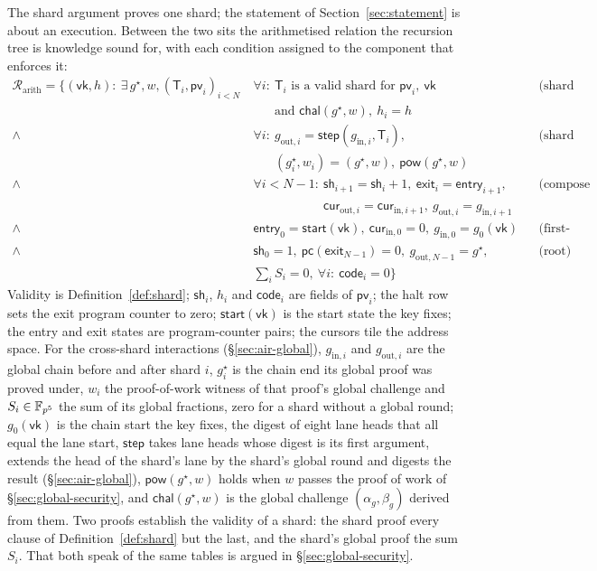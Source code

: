The shard argument proves one shard; the statement of Section~\ref{sec:statement} is about an execution. Between the two sits the arithmetised relation the recursion tree is knowledge sound for, with each condition assigned to the component that enforces it:
\begin{align*}
  \mathcal R_{\mathrm{arith}} = \Big\{ (\mathsf{vk}, h) :\ \exists\, g^\star, w, (\mathsf{T}_i, \mathsf{pv}_i)_{i<N}\
  & \forall i:\ \mathsf{T}_i \text{ is a valid shard for } \mathsf{pv}_i,\ \mathsf{vk}
    && \text{(shard and global proofs)} \\
  & \phantom{\forall i:\ }\text{and } \mathsf{chal}(g^\star, w),\ h_i = h \\
  \wedge\ & \forall i:\ g_{\mathrm{out},i} = \mathsf{step}(g_{\mathrm{in},i}, \mathsf{T}_i),
    && \text{(shard and global leaves)} \\
  & \phantom{\forall i:\ }(g^\star_i, w_i) = (g^\star, w),\ \mathsf{pow}(g^\star, w) \\
  \wedge\ & \forall i<N-1:\ \mathsf{sh}_{i+1} = \mathsf{sh}_i + 1,\ \mathsf{exit}_i = \mathsf{entry}_{i+1},
    && \text{(compose nodes)} \\
  & \phantom{\forall i<N-1:\ }\mathsf{cur}_{\mathrm{out},i} = \mathsf{cur}_{\mathrm{in},i+1},\ g_{\mathrm{out},i} = g_{\mathrm{in},i+1} \\
  \wedge\ & \mathsf{entry}_0 = \mathsf{start}(\mathsf{vk}),\ \mathsf{cur}_{\mathrm{in},0} = 0,\ g_{\mathrm{in},0} = g_0(\mathsf{vk})
    && \text{(first-shard leaf)} \\
  \wedge\ & \mathsf{sh}_0 = 1,\ \mathsf{pc}(\mathsf{exit}_{N-1}) = 0,\ g_{\mathrm{out},N-1} = g^\star,
    && \text{(root)} \\
  & \textstyle\sum_i S_i = 0,\ \forall i:\ \mathsf{code}_i = 0 \Big\}
\end{align*}
Validity is Definition~\ref{def:shard}; $\mathsf{sh}_i$, $h_i$ and $\mathsf{code}_i$ are fields of $\mathsf{pv}_i$; the halt row sets the exit program counter to zero; $\mathsf{start}(\mathsf{vk})$ is the start state the key fixes; the entry and exit states are program-counter pairs; the cursors tile the address space. For the cross-shard interactions (\S\ref{sec:air-global}), $g_{\mathrm{in},i}$ and $g_{\mathrm{out},i}$ are the global chain before and after shard $i$, $g^\star_i$ is the chain end its global proof was proved under, $w_i$ the proof-of-work witness of that proof's global challenge and $S_i \in \mathbb{F}_{p^5}$ the sum of its global fractions, zero for a shard without a global round; $g_0(\mathsf{vk})$ is the chain start the key fixes, the digest of eight lane heads that all equal the lane start, $\mathsf{step}$ takes lane heads whose digest is its first argument, extends the head of the shard's lane by the shard's global round and digests the result (\S\ref{sec:air-global}), $\mathsf{pow}(g^\star, w)$ holds when $w$ passes the proof of work of \S\ref{sec:global-security}, and $\mathsf{chal}(g^\star, w)$ is the global challenge $(\alpha_g, \beta_g)$ derived from them. Two proofs establish the validity of a shard: the shard proof every clause of Definition~\ref{def:shard} but the last, and the shard's global proof the sum $S_i$. That both speak of the same tables is argued in \S\ref{sec:global-security}.

